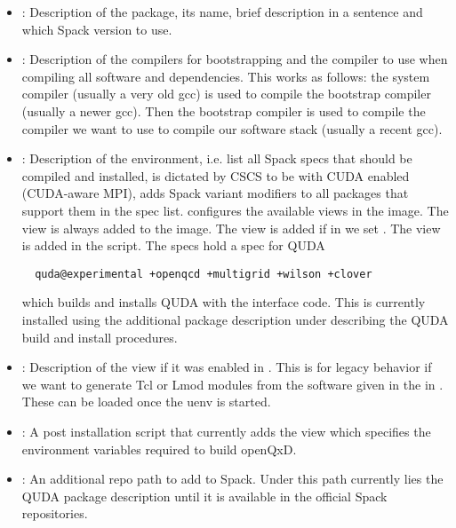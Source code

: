 \begin{itemize}
  \item {}: Description of the package, its name, brief description in a sentence and which Spack version to use.
  \item {}: Description of the compilers for bootstrapping and the compiler to use when compiling all software and dependencies. This works as follows: the system compiler (usually a very old gcc) is used to compile the bootstrap compiler (usually a newer gcc). Then the bootstrap compiler is used to compile the compiler we want to use to compile our software stack (usually a recent gcc).
  \item{: Description of the environment, i.e.  list all Spack specs that should be compiled and installed,  is dictated by CSCS to be  with CUDA enabled (CUDA-aware MPI),  adds Spack variant modifiers to all packages that support them in the spec list.  configures the available views in the image. The view  is always added to the image. The view  is added if in  we set . The  view is added in the  script. The specs hold a spec for QUDA
  \begin{verbatim}
  quda@experimental +openqcd +multigrid +wilson +clover
  \end{verbatim}
  which builds and installs QUDA with the interface code. This is currently installed using the additional package description under  describing the QUDA build and install procedures. }
  \item {}: Description of the  view if it was enabled in . This is for legacy behavior if we want to generate Tcl\cite{online:tcl} or Lmod\cite{github:lmod} modules from the software given in the  in . These can be loaded once the uenv is started.
  \item {}: A post installation script that currently adds the  view which specifies the environment variables required to build openQxD.
  \item {}: An additional repo path to add to Spack. Under this path currently lies the QUDA package description until it is available in the official Spack repositories.
\end{itemize}


